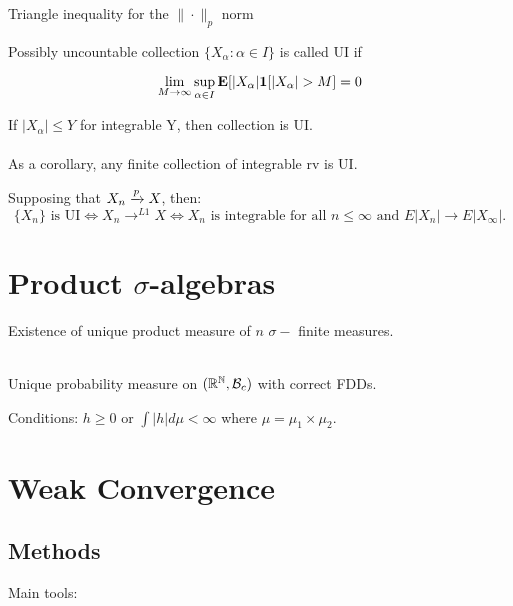 \documentclass{article}
\begin{document}
\begin{theorem}[Minkowski]
Triangle inequality for the $\|\cdot \|_p $ norm
\end{theorem}

\begin{definition}
Possibly uncountable collection $\{X_\alpha: \alpha \in I\}$ is called UI if 

$$\lim_{M\to\infty} \sup_{\alpha \in I} \mathbf{E}[|X_\alpha| \boldsymbol{1}[|X_\alpha | >M] = 0$$
\end{definition}
\begin{fact}
If $|X_\alpha|\leq Y$ for integrable Y, then collection is UI. \\\\

As a corollary, any finite collection of integrable rv is UI.
\end{fact}

\begin{theorem}
Supposing that $X_n \xrightarrow{p} X$, then:
$$\{X_n\} \text{ is UI} \iff X_n \to^{L1} X \iff X_n \text{ is integrable for all } n\leq \infty \text{ and } E|X_n| \to E|X_\infty|.$$
\end{theorem}




\section{Product $\sigma$-algebras}
Existence of unique product measure of $n$ $\sigma-$ finite measures. \\\\

\begin{theorem}
Unique probability measure on $(\mathbb R^\mathbb N, \mathcal B_c)$ with correct FDDs. 
\end{theorem}



\begin{theorem}[Fubini's]
Conditions: $h\geq0$ or $\int |h| d\mu <\infty $ where $\mu = \mu_1 \times \mu_2$. 
\end{theorem}
\section{Weak Convergence}
\subsection{Methods}
Main tools: 
\end{document}
